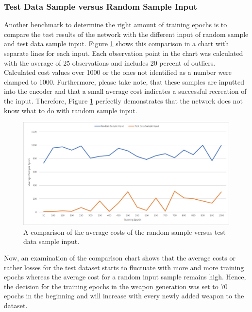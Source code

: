 \documentclass[MGS,Master,english]{twbook}%
\begin{document}
\subsubsection{Test Data Sample versus Random Sample Input}
Another benchmark to determine the right amount of training epochs is to compare the test results of the network with the different input of random sample and test data sample input. Figure \ref{fig::vae::epochsFailureRate} shows this comparison in a chart with separate lines for each input. Each observation point in the chart was calculated with the average of 25 observations and includes 20 percent of outliers. Calculated cost values over 1000 or the ones not identified as a number were clamped to 1000. Furthermore, please take note, that these samples are inputted into the encoder and that a small average cost indicates a successful recreation of the input. Therefore, Figure \ref{fig::vae::epochsFailureRate} perfectly demonstrates that the network does not know what to do with random sample input.
\begin{figure}[!ht]
	\centering
	\includegraphics[width=1.0\linewidth]{PICs/trained_vae/epoch_failure_rate}
	\caption{A comparison of the average costs of the random sample versus test data sample input.} \label{fig::vae::epochsFailureRate}
\end{figure}

Now, an examination of the comparison chart shows that the average costs or rather losses for the test dataset starts to fluctuate with more and more training epochs whereas the average cost for a random input sample remains high. Hence, the decision for the training epochs in the weapon generation was set to 70 epochs in the beginning and will increase with every newly added weapon to the dataset. 
\end{document}
